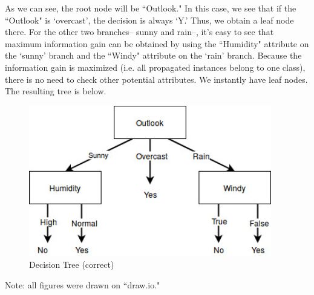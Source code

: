 \documentclass[12pt]{article}
\begin{document}
	As we can see, the root node will be ``Outlook." In this case, we see that if the ``Outlook" is `overcast', the decision is always `Y.' Thus, we obtain a leaf node there. For the other two branches-- sunny and rain--, it's easy to see that maximum information gain can be obtained by using the ``Humidity" attribute on the `sunny' branch and the ``Windy" attribute on the `rain' branch. Because the information gain is maximized (i.e. all propagated instances belong to one class), there is no need to check other potential attributes. We instantly have leaf nodes. The resulting tree is below.
	\begin{figure}[H]
		\begin{center}
			\includegraphics[width=300pt]{hw3_ml_tree2.jpg}
			\caption{Decision Tree (correct)}
			\label{fig:tree2}
		\end{center}
	\end{figure}
	Note: all figures were drawn on ``draw.io."
	
\end{document}
